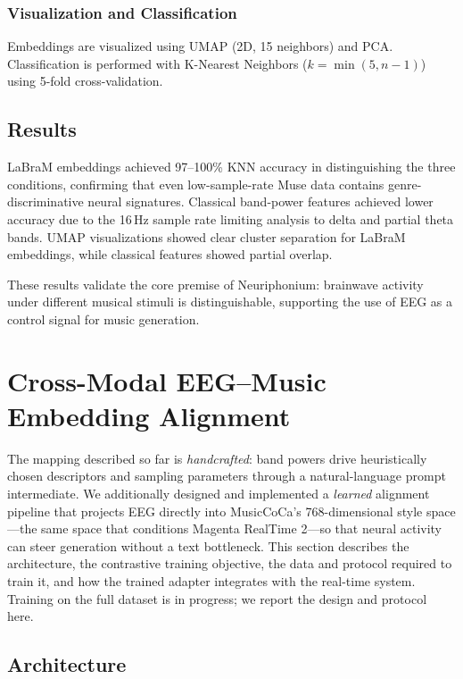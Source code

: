 \documentclass[manuscript,review,anonymous]{acmart}
\begin{document}
\subsubsection{Visualization and Classification}

Embeddings are visualized using UMAP (2D, 15 neighbors) and PCA. Classification is performed with K-Nearest Neighbors ($k = \min(5, n-1)$) using 5-fold cross-validation.

\subsection{Results}

LaBraM embeddings achieved 97--100\% KNN accuracy in distinguishing the three conditions, confirming that even low-sample-rate Muse data contains genre-discriminative neural signatures. Classical band-power features achieved lower accuracy due to the 16\,Hz sample rate limiting analysis to delta and partial theta bands. UMAP visualizations showed clear cluster separation for LaBraM embeddings, while classical features showed partial overlap.

These results validate the core premise of Neuriphonium: brainwave activity under different musical stimuli is distinguishable, supporting the use of EEG as a control signal for music generation.

\section{Cross-Modal EEG--Music Embedding Alignment}
\label{sec:alignment}

The mapping described so far is \emph{handcrafted}: band powers drive heuristically chosen descriptors and sampling parameters through a natural-language prompt intermediate. We additionally designed and implemented a \emph{learned} alignment pipeline that projects EEG directly into MusicCoCa's 768-dimensional style space---the same space that conditions Magenta RealTime 2---so that neural activity can steer generation without a text bottleneck. This section describes the architecture, the contrastive training objective, the data and protocol required to train it, and how the trained adapter integrates with the real-time system. Training on the full dataset is in progress; we report the design and protocol here.

\subsection{Architecture}
\end{document}
